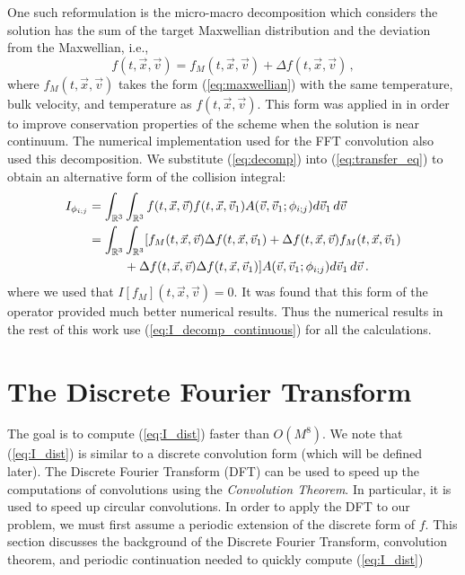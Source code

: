 \documentclass[12pt]{CSUNthesis}
\def\R{\mathbb{R}}
\def\R{\mathbb{R}}
\newcommand{\vecx}{\vec{x}}
\newcommand{\vecv}{\vec{v}}
\begin{document}
One such reformulation is the micro-macro decomposition \cite{FilbetMouhotPareschi2006} which considers the solution has the sum of the target Maxwellian distribution and the deviation from the Maxwellian, i.e.,
\begin{equation}
\label{eq:decomp}
f(t,\vecx,\vecv) = f_M(t, \vecx, \vecv) + \Delta f(t,\vecx,\vecv)\, ,
\end{equation}
where $f_M(t,\vecx,\vecv)$ takes the form (\ref{eq:maxwellian}) with the same temperature, bulk velocity, and temperature as $f(t,\vecx,\vecv)$. This form was applied in \cite{AlekseenkoJosyula2012} in order to improve conservation properties of the scheme when the solution is near continuum. The numerical implementation used for the FFT convolution also used this decomposition. We substitute (\ref{eq:decomp}) into (\ref{eq:transfer_eq}) to obtain an alternative form of the collision integral:
\begin{align}
\label{eq:I_decomp_continuous}
I_{\phi_{i;j}}&= \int_{\R^3}\int_{\R^3} f(t,\vec{x},\vec{v}) f(t,\vec{x},\vec{v}_{1})
 A(\vec{v},\vec{v}_{1};\phi_{i;j})   d\vec{v}_{1}\, d\vec{v}\, \nonumber \\
 &=\int_{\R^3}\int_{\R^3} [f_{M}(t,\vec{x},\vec{v}) \Delta f(t,\vec{x},\vec{v}_{1})
 +\Delta f(t,\vec{x},\vec{v}) f_{M}(t,\vec{x},\vec{v}_{1})\nonumber \\
 &\hspace*{10mm}{}+ \Delta f(t,\vec{x},\vec{v}) \Delta f(t,\vec{x},\vec{v}_{1})]
 A(\vec{v},\vec{v}_{1};\phi_{i;j})   d\vec{v}_{1}\, d\vec{v}\, . 
\end{align}
where we used that $I[f_M](t,\vecx,\vecv)=0$. It was found that this form of the operator provided much better numerical results. Thus the numerical results in the rest of this work use (\ref{eq:I_decomp_continuous}) for all the calculations. 


\chapter{The Discrete Fourier Transform}
\label{chap:dft}
The goal is to compute (\ref{eq:I_dist}) faster than $O(M^8)$. We note that (\ref{eq:I_dist}) is similar to a discrete convolution form (which will be defined later). The Discrete Fourier Transform (DFT) can be used to speed up the computations of convolutions using the \textit{Convolution Theorem}. In particular, it is used to speed up circular convolutions. In order to apply the DFT to our problem, we must first assume a periodic extension of the discrete form of $f$. This section discusses the background of the Discrete Fourier Transform, convolution theorem, and periodic continuation needed to quickly compute (\ref{eq:I_dist}) 
\end{document}
